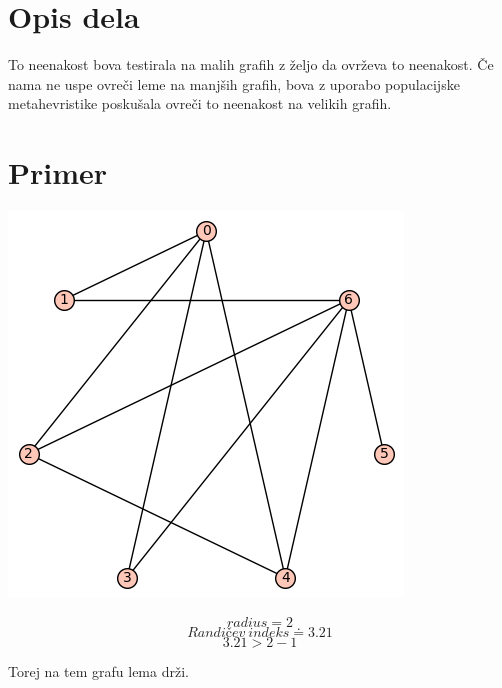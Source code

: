 \documentclass[a4paper, 10pt]{article}
\begin{document}
\section{Opis dela}

To neenakost bova testirala na malih grafih z željo da ovrževa to neenakost. Če nama ne uspe ovreči leme na manjših grafih, bova z uporabo populacijske metahevristike poskušala ovreči to neenakost na velikih grafih.

\section{Primer}

\includegraphics{primer}

$$radius = 2$$
$$Randičev \ indeks \doteq 3.21$$
$$3.21 > 2 - 1$$

Torej na tem grafu lema drži.
\end{document}
